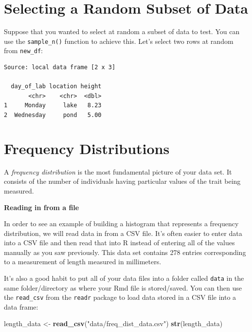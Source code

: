 \documentclass[twoside, 12pt]{article}
\newenvironment{Shaded}{\begin{snugshade}}{\end{snugshade}}
\newcommand{\KeywordTok}[1]{\textcolor[rgb]{0.13,0.29,0.53}{\textbf{{#1}}}}
\newcommand{\DecValTok}[1]{\textcolor[rgb]{0.00,0.00,0.81}{{#1}}}
\newcommand{\StringTok}[1]{\textcolor[rgb]{0.31,0.60,0.02}{{#1}}}
\newcommand{\NormalTok}[1]{{#1}}
\newcommand{\nonumsection}[1]{
  \addtocontents{toc}{\protect\setcounter{tocdepth}{-1}}
  \section{#1}
  \addtocontents{toc}{\protect\setcounter{tocdepth}{1}}
}
\begin{document}
\nonumsection{Selecting a Random Subset of Data}

Suppose that you wanted to select at random a subset of data to test.
You can use the \texttt{sample\_n()} function to achieve this. Let's
select two rows at random from \texttt{new\_df}:

\begin{Shaded}
\end{Shaded}

\begin{Verbatim}[frame=single]
Source: local data frame [2 x 3]

  day_of_lab location height
       <chr>    <chr>  <dbl>
1     Monday     lake   8.23
2  Wednesday     pond   5.00
\end{Verbatim}

\section{Frequency Distributions}\label{frequency-distributions}

A \emph{frequency distribution} is the most fundamental picture of your
data set. It consists of the number of individuals having particular
values of the trait being measured.

\textbf{Reading in from a file}

In order to see an example of building a histogram that represents a
frequency distribution, we will read data in from a CSV file. It's often
easier to enter data into a CSV file and then read that into R instead
of entering all of the values manually as you saw previously. This data
set contains 278 entries corresponding to a measurement of length
measured in millimeters.

It's also a good habit to put all of your data files into a folder
called \texttt{data} in the same folder/directory as where your Rmd file
is stored/saved. You can then use the \texttt{read\_csv} from the
\texttt{readr} package to load data stored in a CSV file into a data
frame:

\begin{Shaded}
\begin{Highlighting}[]
\NormalTok{length_data <-}\StringTok{ }\KeywordTok{read_csv}\NormalTok{(}\StringTok{"data/freq_dist_data.csv"}\NormalTok{)}
\KeywordTok{str}\NormalTok{(length_data)}
\end{Highlighting}
\end{Shaded}
\end{document}
